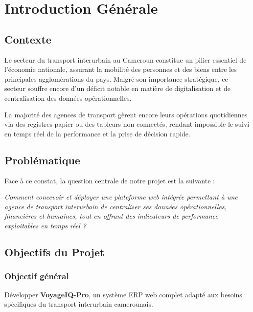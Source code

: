 \documentclass[12pt,a4paper]{report}
\begin{document}
\tableofcontents
\newpage

\chapter{Introduction Générale}

\section{Contexte}

Le secteur du transport interurbain au Cameroun constitue un pilier essentiel de
l'économie nationale, assurant la mobilité des personnes et des biens entre les
principales agglomérations du pays. Malgré son importance stratégique, ce secteur
souffre encore d'un déficit notable en matière de digitalisation et de centralisation
des données opérationnelles.

La majorité des agences de transport gèrent encore leurs opérations quotidiennes
via des registres papier ou des tableurs non connectés, rendant impossible le suivi
en temps réel de la performance et la prise de décision rapide.

\section{Problématique}

Face à ce constat, la question centrale de notre projet est la suivante :

\begin{tcolorbox}[colback=gray!10, colframe=gold, title=Question centrale]
\textit{Comment concevoir et déployer une plateforme web intégrée permettant à
une agence de transport interurbain de centraliser ses données opérationnelles,
financières et humaines, tout en offrant des indicateurs de performance exploitables
en temps réel ?}
\end{tcolorbox}

\section{Objectifs du Projet}

\subsection{Objectif général}
Développer \textbf{VoyageIQ-Pro}, un système ERP web complet adapté aux besoins
spécifiques du transport interurbain camerounais.
\end{document}
